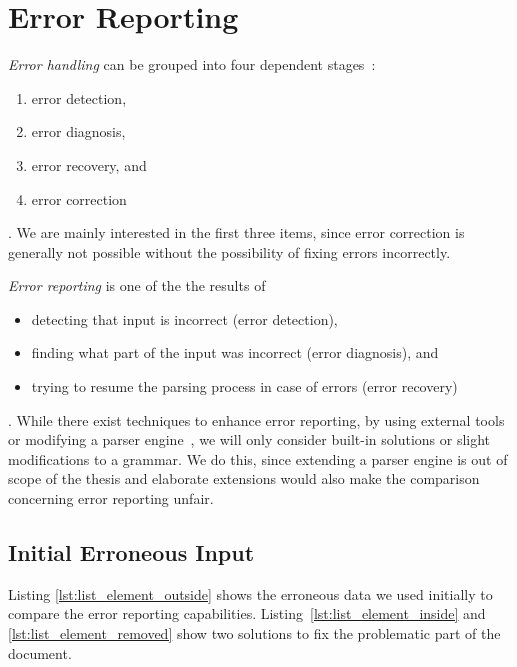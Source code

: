 \section{Error Reporting}
\label{sec:error_reporting}

\emph{Error handling} can be grouped into four dependent stages~\cite{ruefenacht2016error, pottier2016reachability}:

\begin{enumerate}
  \item error detection,
  \item error diagnosis,
  \item error recovery, and
  \item error correction
\end{enumerate}

. We are mainly interested in the first three items, since error correction is generally not possible without the possibility of fixing errors incorrectly.

\emph{Error reporting} is one of the the results of

\begin{itemize}
  \item detecting that input is incorrect (error detection),
  \item finding what part of the input was incorrect (error diagnosis), and
  \item trying to resume the parsing process in case of errors (error recovery)
\end{itemize}

. While there exist techniques to enhance error reporting, by using external tools or modifying a parser engine~\cite{jeffery2003generating, cox2010errors}, we will only consider built-in solutions or slight modifications to a grammar. We do this, since extending a parser engine is out of scope of the thesis and elaborate extensions would also make the comparison concerning error reporting unfair.

\subsection{Initial Erroneous Input}

Listing \ref{lst:list_element_outside} shows the erroneous  data we used initially to compare the error reporting capabilities. Listing~\ref{lst:list_element_inside} and \ref{lst:list_element_removed} show two solutions to fix the problematic part of the  document.

